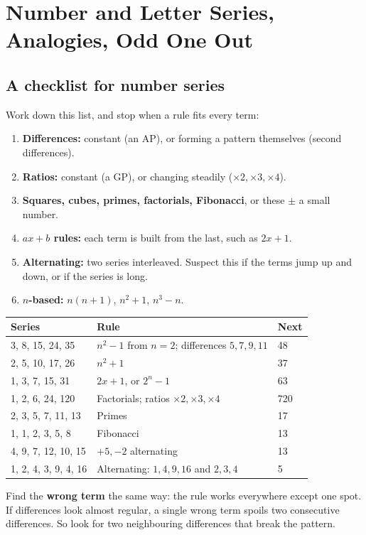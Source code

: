 \documentclass[11pt,a4paper,openany]{report}
\begin{document}
\chapter{Number and Letter Series, Analogies, Odd One Out}\label{ch:series}

\section{A checklist for number series}
Work down this list, and stop when a rule fits every term:
\begin{enumerate}[nosep]
\item \textbf{Differences:} constant (an AP), or forming a pattern themselves (second differences).
\item \textbf{Ratios:} constant (a GP), or changing steadily ($\times2,\times3,\times4$).
\item \textbf{Squares, cubes, primes, factorials, Fibonacci}, or these $\pm$ a small number.
\item \textbf{$ax+b$ rules:} each term is built from the last, such as $2x+1$.
\item \textbf{Alternating:} two series interleaved. Suspect this if the terms jump up and down, or if the series is long.
\item \textbf{$n$-based:} $n(n+1)$, $n^2+1$, $n^3-n$.
\end{enumerate}

\begin{center}\small
\begin{tabular}{lll}
\toprule
Series & Rule & Next\\\midrule
3, 8, 15, 24, 35 & $n^2-1$ from $n=2$; differences $5,7,9,11$ & 48\\
2, 5, 10, 17, 26 & $n^2+1$ & 37\\
1, 3, 7, 15, 31 & $2x+1$, or $2^n-1$ & 63\\
1, 2, 6, 24, 120 & Factorials; ratios $\times2,\times3,\times4$ & 720\\
2, 3, 5, 7, 11, 13 & Primes & 17\\
1, 1, 2, 3, 5, 8 & Fibonacci & 13\\
4, 9, 7, 12, 10, 15 & $+5,-2$ alternating & 13\\
1, 2, 4, 3, 9, 4, 16 & Alternating: $1,4,9,16$ and $2,3,4$ & 5\\
\bottomrule
\end{tabular}
\end{center}

\begin{shortcut}
Find the \textbf{wrong term} the same way: the rule works everywhere except one spot. If differences look almost regular, a single wrong term spoils two consecutive differences. So look for two neighbouring differences that break the pattern.
\end{shortcut}
\end{document}
